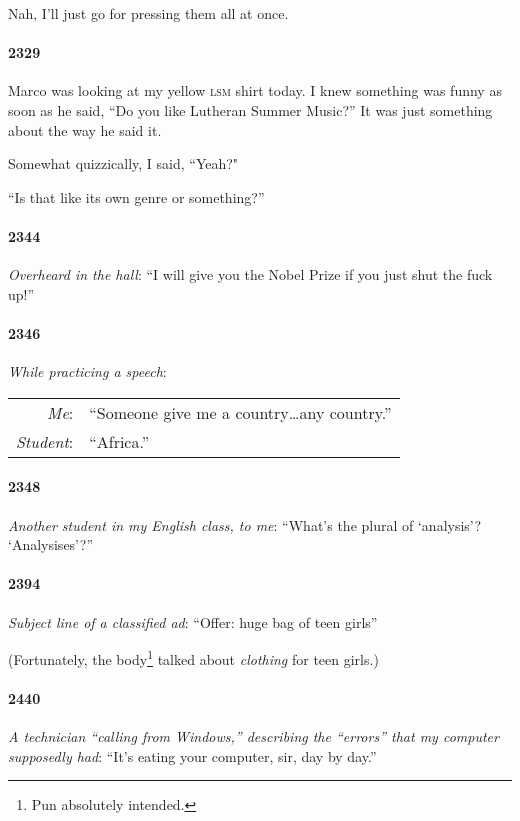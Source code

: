 \documentclass[10pt]{memoir}
\newcommand{\speakertag}[1]{\emph{#1}: }
\newcommand{\st}{\speakertag}
\newcommand{\intro}[1]{\emph{#1}}
\begin{document}
Nah, I'll just go for pressing them all at once.

\paragraph{2329} Marco was looking at my yellow \textsc{lsm} shirt today. I knew something was funny as soon as he said, ``Do you like Lutheran Summer Music?'' It was just something about the way he said it.

Somewhat quizzically, I said, ``Yeah?"

``Is that like its own genre or something?''

\paragraph{2344} \intro{Overheard in the hall}: ``I will give you the Nobel Prize if you just shut the fuck up!''

\paragraph{2346} \intro{While practicing a speech}:\\

\noindent \begin{tabularx}{\textwidth}{r X}
  \st{Me} & ``Someone give me a country\ldots any country.''\\
  \st{Student} & ``Africa.''
\end{tabularx}

\paragraph{2348} \intro{Another student in my English class, to me}: ``What's the plural of `analysis'? `Analysises'?''

\paragraph{2394} \intro{Subject line of a classified ad}: ``Offer: huge bag of teen girls''

(Fortunately, the body\footnote{Pun absolutely intended.} talked about \emph{clothing} for teen girls.)

\paragraph{2440} \intro{A technician ``calling from Windows,'' describing the ``errors'' that my computer supposedly had}: ``It's eating your computer, sir, day by day.''
\end{document}
